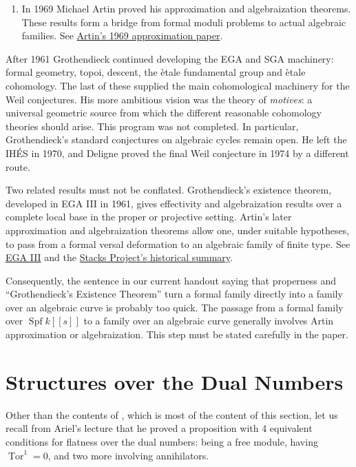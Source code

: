 \begin{enumerate}
\item In 1969 Michael Artin proved his
approximation and algebraization theorems.
These results form a bridge from formal
moduli problems to actual algebraic
families. See
\href{https://www.numdam.org/articles/10.1007/BF02684596/}
{Artin's 1969 approximation paper}.
\end{enumerate}

\noindent
After 1961 Grothendieck continued developing
the EGA and SGA machinery: formal geometry,
topoi, descent, the \`etale fundamental
group and \`etale cohomology. The last of
these supplied the main cohomological
machinery for the Weil conjectures. His more
ambitious vision was the theory of
\emph{motives}: a universal geometric source
from which the different reasonable
cohomology theories should arise. This
program was not completed. In particular,
Grothendieck's standard conjectures on
algebraic cycles remain open. He left the
IH\'ES in 1970, and Deligne proved the final
Weil conjecture in 1974 by a different
route.

\begin{remark}
Two related results must not be conflated.
Grothendieck's existence theorem, developed
in EGA III in 1961, gives effectivity and
algebraization results over a complete local
base in the proper or projective setting.
Artin's later approximation and
algebraization theorems allow one, under
suitable hypotheses, to pass from a formal
versal deformation to an algebraic family
of finite type. See
\href{https://www.numdam.org/item/?id=PMIHES_1961__11__5_0}
{EGA III} and the
\href{https://stacks.math.columbia.edu/tag/04UW}
{Stacks Project's historical summary}.

Consequently, the sentence in our current
handout saying that properness and
``Grothendieck's Existence Theorem'' turn a
formal family directly into a family over
an algebraic curve is probably too quick.
The passage from a formal family over
$\operatorname{Spf}k[[s]]$ to a family over
an algebraic curve generally involves Artin
approximation or algebraization. This step
must be stated carefully in the paper.
\end{remark}


\section{Structures over the Dual Numbers}
\label{section-structures-dual-numbers}

\noindent
Other than the contents of
\cite[Chapter 1, Section 2]
{Hartshorne-deformation}, which
is most of the content of this section,
let us recall from Ariel's
lecture that he proved a proposition
with 4 equivalent conditions
for flatness over the dual numbers:
being a free module, having
$\operatorname{Tor}^1=0$, and two more
involving annihilators.

